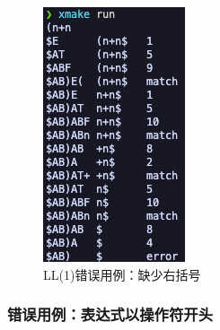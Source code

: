 \begin{figure}[htbp]
\begin{minipage}[t]{0.3\textwidth}
        \includegraphics[width=\textwidth]{images/ll_9.png}
        \caption{LL(1)错误用例：缺少右括号}
        \label{fig:ll-9}
    \end{minipage}
\end{figure}

\subsubsection{错误用例：表达式以操作符开头}
